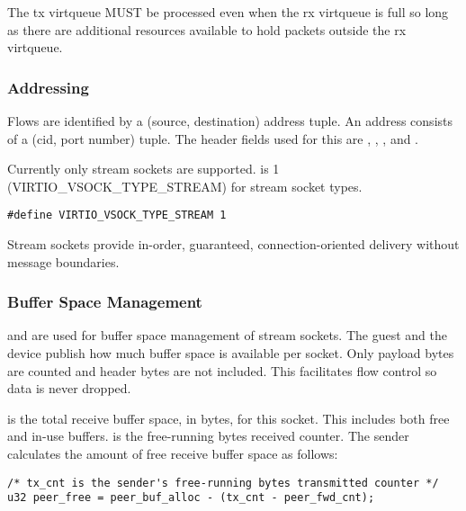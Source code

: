 
The tx virtqueue MUST be processed even when the rx virtqueue is full so long as there are additional resources available to hold packets outside the rx virtqueue.

\subsubsection{Addressing}\label{sec:Device Types / Socket Device / Device Operation / Addressing}

Flows are identified by a (source, destination) address tuple.  An address
consists of a (cid, port number) tuple. The header fields used for this are
, , , and .

Currently only stream sockets are supported.  is 1 (VIRTIO_VSOCK_TYPE_STREAM)
for stream socket types.

\begin{lstlisting}
#define VIRTIO_VSOCK_TYPE_STREAM 1
\end{lstlisting}

Stream sockets provide in-order, guaranteed, connection-oriented delivery
without message boundaries.

\subsubsection{Buffer Space Management}\label{sec:Device Types / Socket Device / Device Operation / Buffer Space Management}
 and  are used for buffer space management of
stream sockets. The guest and the device publish how much buffer space is
available per socket. Only payload bytes are counted and header bytes are not
included. This facilitates flow control so data is never dropped.

 is the total receive buffer space, in bytes, for this socket.
This includes both free and in-use buffers.  is the free-running
bytes received counter. The sender calculates the amount of free receive buffer
space as follows:

\begin{lstlisting}
/* tx_cnt is the sender's free-running bytes transmitted counter */
u32 peer_free = peer_buf_alloc - (tx_cnt - peer_fwd_cnt);
\end{lstlisting}

